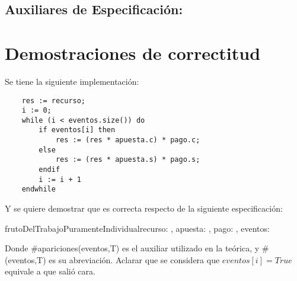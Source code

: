 \documentclass[10pt,a4paper]{article}
\begin{document}
\subsection{Auxiliares de Especificación:}

	{
	}

	{
	}
	{
	}

\section{Demostraciones de correctitud}

 Se tiene la siguiente implementación:

\begin{lstlisting}
	res := recurso;
	i := 0;
	while (i < eventos.size()) do
		if eventos[i] then
			res := (res * apuesta.c) * pago.c;
		else
			res := (res * apuesta.s) * pago.s;
		endif
		i := i + 1
	endwhile
\end{lstlisting}

 Y se quiere demostrar que es correcta respecto de la siguiente especificación:
\begin{proc}{frutoDelTrabajoPuramenteIndividual}{\In recurso: \float, \In apuesta: , \In pago: , \In eventos: \TLista{\bool} }{\float}



\end{proc}

 Donde #apariciones(eventos,T) es el auxiliar utilizado en la teórica, y #(eventos,T) es su abreviación.
 Aclarar que se considera que $eventos[i] = True$ equivale a que salió cara.

\vspace{0.3cm}
\end{document}
